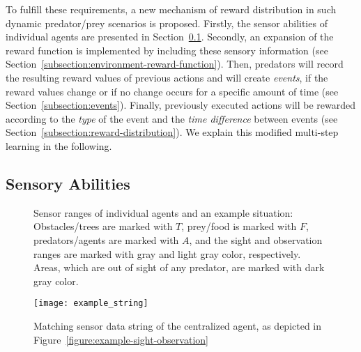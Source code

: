 To fulfill these requirements, a new mechanism of reward distribution in such dynamic predator/prey scenarios is proposed. Firstly, the sensor abilities of individual agents are presented in Section~\ref{subsection:sensory-abilities}. Secondly, an expansion of the reward function is implemented by 
including these sensory information (see Section~\ref{subsection:environment-reward-function}). Then, predators will record the resulting reward values of previous actions and will create \emph{events}, if the reward values change or if no change occurs for a specific amount of time (see Section~\ref{subsection:events}). Finally, previously executed actions will be rewarded according to the \emph{type} of the event and the \emph{time difference} between events
(see Section~\ref{subsection:reward-distribution}). We explain this modified multi-step learning in the following. 

\subsection{Sensory Abilities}
\label{subsection:sensory-abilities}

\begin{figure}[ht]
	\hfill
  \hfill
  \subfigure[Example situation]{ %
  	\label{figure:example-sight-observation}
  	\texttt{[image: example\_sight\_observation]}}
  \caption{Sensor ranges of individual agents and an example situation: Obstacles/trees are marked with $T$, prey/food is marked with $F$, predators/agents are marked with $A$, and the sight and observation ranges are marked with gray and light gray color, respectively. Areas, which are out of sight of any predator, are marked with dark gray color.}
  \label{figure:sight-directions}
\end{figure}

\begin{figure}[ht]
	\centerline{
		\texttt{[image: example\_string]}}
	\caption{Matching sensor data string of the centralized agent, as depicted in Figure~\ref{figure:example-sight-observation}}
	\label{figure:example-string}
\end{figure}

